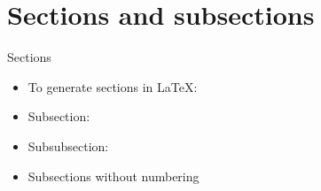 \documentclass[10pt,times]{beamer}
\subtitle{Part I: Writing papers using \LaTeX}
\begin{document}
\begin{frame}
  \titlepage
\end{frame}
\section{Sections and subsections}

\begin{frame}{Sections}
\begin{itemize}
\item To generate sections in \LaTeX: 
\item Subsection: 
\item Subsubsection: 
\item Subsections without numbering 

\end{itemize}
\end{frame}



\end{document}
